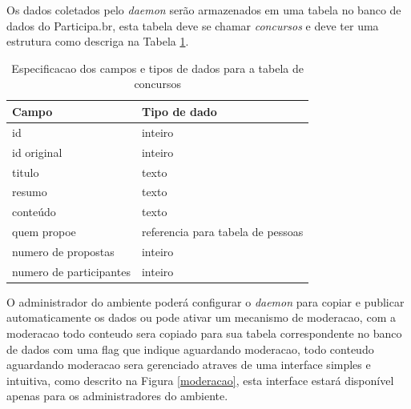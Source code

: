 \documentclass[12pt]{article}
\begin{document}
Os dados coletados pelo {\it daemon} serão armazenados em uma tabela no banco
de dados do Participa.br, esta tabela deve se chamar {\it concursos} e deve
ter uma estrutura como descriga na Tabela \ref{dados}.

\begin{table}[t]
\centering
\begin{tabular}{|l|l|}
  \hline
  Campo                   & Tipo de dado \\
  \hline
  id                      & inteiro \\
  id original             & inteiro \\
  titulo                  & texto \\
  resumo                  & texto \\
  conteúdo                & texto \\
  quem propoe             & referencia para tabela de pessoas \\
  numero de propostas     & inteiro \\
  numero de participantes & inteiro \\
  \hline
\end{tabular}
\caption{Especificacao dos campos e tipos de dados para a tabela de concursos}
\label{dados}
\end{table}


O administrador do ambiente poderá configurar o {\it daemon} para copiar e
publicar automaticamente os dados ou pode ativar um mecanismo de moderacao,
com a moderacao todo conteudo sera copiado para sua tabela correspondente no
banco de dados com uma flag que indique aguardando moderacao, todo conteudo
aguardando moderacao sera gerenciado atraves de uma interface simples e
intuitiva, como descrito na Figura \ref{moderacao}, esta interface estará
disponível apenas para os administradores do ambiente.
\end{document}
